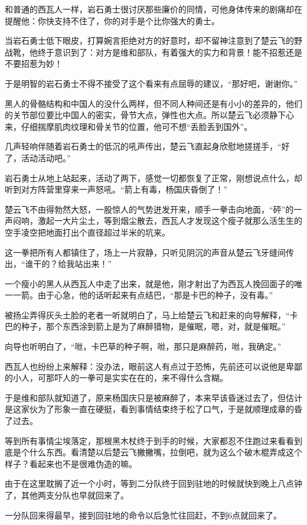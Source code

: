 和普通的西瓦人一样，岩石勇士很讨厌那些廉价的同情，可他身体传来的剧痛却在提醒他：你快支持不住了，你的对手是个比你强大的勇士。

当岩石勇士低下眼皮，打算婉言拒绝对方的好意时，却不留神注意到了楚云飞的野战靴，他终于意识到了：对方是维和部队，有着强大的实力和背景！能不招惹还是不要招惹为妙！

于是明智的岩石勇士不得不接受了这个看来有点屈辱的建议，“那好吧，谢谢你。”

黑人的骨骼结构和中国人的没什么两样，但不同人种间还是有小小的差异的，他们的关节部位要比中国人的密实，骨节大点，弹性也大点。所以楚云飞必须静下心来，仔细揣摩肌肉纹理和骨关节的位置，他可不想“丢脸丢到国外”。

几声轻响伴随着岩石勇士的低沉的吼声传出，楚云飞直起身欣慰地搓搓手，“好了，活动活动吧。”

岩石勇士从地上站起来，活动了两下，感觉一切都恢复了正常，刚想说点什么，却听到对方阵营里穿来一声怒吼。“箭上有毒，杨国庆昏倒了！”

楚云飞不由得勃然大怒，一股惊人的气势迸发开来，顺手一拳击向地面，“砰”的一声闷响，激起一大片尘土，等到烟尘散去，西瓦人才发现这个瘦子就那么活生生的空手凌空把地面打出个直径超过半米的坑来。

这一拳把所有人都镇住了，场上一片寂静，只听见阴沉的声音从楚云飞牙缝间传出，“谁干的？给我站出来！”

一个瘦小的黑人从西瓦人中走了出来，就是他，刚才射出了为西瓦人挽回面子的唯一一箭。由于心急，他的话听起来有点结巴，“那是卡巴的种子，没有毒。”

被扬尘弄得灰头土脸的老者一听就明白了，马上给楚云飞和赶来的向导解释，“卡巴的种子，那个东西涂到箭上是为了麻醉猎物，是催眠，嗯，对，就是催眠。”

向导也听明白了，“咝，卡巴草的种子啊，咝，那只是麻醉药，咝，我确定。”

西瓦人也纷纷上来解释：没办法，眼前这人有点过于恐怖，先前还可以说他是卑鄙的小人，可那吓人的一拳可是实实在在的，来不得什么含糊。

于是维和部队就知道了，原来杨国庆只是被麻醉了，本来早该昏迷过去了，但估计是这家伙为了形象一直在硬挺，看到事情结束终于松了口气，于是就顺理成章的昏了过去。

等到所有事情尘埃落定，那根黑木杖终于到手的时候，大家都忍不住跑过来看看到底是个什么东西。看清楚以后楚云飞撇撇嘴，拉倒吧，就为这么个破木棍弄成这个样子？看起来也不是很难伪造的嘛。

由于在这里耽搁了近一个小时，等到二分队终于回到驻地的时候就快到晚上八点钟了，其他两支分队也早就回来了。

一分队回来得最早，接到回驻地的命令以后急忙往回赶，不到6点就回来了。

